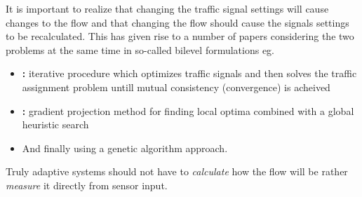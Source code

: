 It is important to realize that changing the traffic signal settings will cause changes to the flow and that changing the flow should cause the signals settings to be recalculated. This has given rise to a number of papers considering the two problems at the same time in so-called bilevel formulations eg. 
\begin{itemize}
\item \textbf{\cite{mc}:} iterative procedure which optimizes traffic signals and then solves the traffic assignment problem untill mutual consistency (convergence) is acheived
\item \textbf{\cite{34}:} gradient projection method for finding local optima combined with a global heuristic search
\item And finally \textbf{\cite{2}} using a genetic algorithm approach.
\end{itemize}

Truly adaptive systems should not have to \textit{calculate} how the flow will be rather \textit{measure} it directly from sensor input.